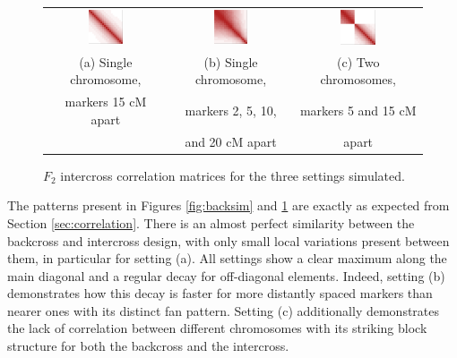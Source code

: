 \documentclass{article}
\begin{document}
\begin{figure}[htp]
  \begin{center}
    \begin{tabular}{ccc}
      \includegraphics[width = 0.300\textwidth]{./img/inter1.png} &
      \includegraphics[width = 0.300\textwidth]{./img/inter2.png} &
      \includegraphics[width = 0.300\textwidth]{./img/inter3.png} \\
      {\footnotesize (a) Single chromosome,} &
      {\footnotesize (b) Single chromosome,} &
      {\footnotesize (c) Two chromosomes,} \\
      {\footnotesize markers 15 cM apart} &
      {\footnotesize markers 2, 5, 10, } &
      {\footnotesize markers 5 and 15 cM} \\
      &
      {\footnotesize and 20 cM apart} &
      {\footnotesize apart} \\ 
    \end{tabular}
  \end{center}
  \caption{$F_2$ intercross correlation matrices for the three settings simulated.}
  \label{fig:intersim}
\end{figure}

The patterns present in Figures \ref{fig:backsim} and \ref{fig:intersim} are exactly as expected from Section \ref{sec:correlation}. There is an almost perfect similarity between the backcross and intercross design, with only small local variations present between them, in particular for setting (a). All settings show a clear maximum along the main diagonal and a regular decay for off-diagonal elements. Indeed, setting (b) demonstrates how this decay is faster for more distantly spaced markers than nearer ones with its distinct fan pattern. Setting (c) additionally demonstrates the lack of correlation between different chromosomes with its striking block structure for both the backcross and the intercross.
\end{document}
